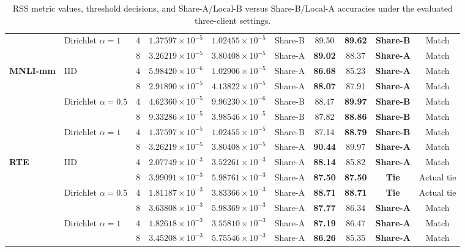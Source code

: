 \documentclass[lettersize,journal]{IEEEtran}
\begin{document}
\begin{table}[!t]
{\begin{tabular}{@{}llcccccccc@{}}
				& \multirow{2}{*}{Dirichlet $\alpha=1$} & 4 & $1.37597\!\times\!10^{-5}$ & $1.02455\!\times\!10^{-5}$ & Share-B & 89.50 & \textbf{89.62} & \textbf{Share-B} & Match \\
				&  & 8 & $3.26219\!\times\!10^{-5}$ & $3.80408\!\times\!10^{-5}$ & Share-A & \textbf{89.02} & 88.37 & \textbf{Share-A} & Match \\
				\midrule
				\multirow{6}{*}{\textbf{MNLI-mm}} & \multirow{2}{*}{IID} & 4 & $5.98420\!\times\!10^{-6}$ & $1.02906\!\times\!10^{-5}$ & Share-A & \textbf{86.68} & 85.23 & \textbf{Share-A} & Match \\
				&  & 8 & $2.91890\!\times\!10^{-5}$ & $4.13822\!\times\!10^{-5}$ & Share-A & \textbf{88.07} & 87.91 & \textbf{Share-A} & Match \\
				& \multirow{2}{*}{Dirichlet $\alpha=0.5$} & 4 & $4.62360\!\times\!10^{-5}$ & $9.96230\!\times\!10^{-6}$ & Share-B & 88.47 & \textbf{89.97} & \textbf{Share-B} & Match \\
				&  & 8 & $9.33286\!\times\!10^{-5}$ & $3.98546\!\times\!10^{-5}$ & Share-B & 87.82 & \textbf{88.86} & \textbf{Share-B} & Match \\
				& \multirow{2}{*}{Dirichlet $\alpha=1$} & 4 & $1.37597\!\times\!10^{-5}$ & $1.02455\!\times\!10^{-5}$ & Share-B & 87.14 & \textbf{88.79} & \textbf{Share-B} & Match \\
				&  & 8 & $3.26219\!\times\!10^{-5}$ & $3.80408\!\times\!10^{-5}$ & Share-A & \textbf{90.44} & 89.97 & \textbf{Share-A} & Match \\
				\midrule
				\multirow{6}{*}{\textbf{RTE}} & \multirow{2}{*}{IID} & 4 & $2.07749\!\times\!10^{-3}$ & $3.52261\!\times\!10^{-3}$ & Share-A & \textbf{88.14} & 85.82 & \textbf{Share-A} & Match \\
				&  & 8 & $3.99091\!\times\!10^{-3}$ & $5.98761\!\times\!10^{-3}$ & Share-A & \textbf{87.50} & \textbf{87.50} & \textbf{Tie} & Actual tie \\
				& \multirow{2}{*}{Dirichlet $\alpha=0.5$} & 4 & $1.81187\!\times\!10^{-3}$ & $3.83366\!\times\!10^{-3}$ & Share-A & \textbf{88.71} & \textbf{88.71} & \textbf{Tie} & Actual tie \\
				&  & 8 & $3.63808\!\times\!10^{-3}$ & $5.98369\!\times\!10^{-3}$ & Share-A & \textbf{87.77} & 86.34 & \textbf{Share-A} & Match \\
				& \multirow{2}{*}{Dirichlet $\alpha=1$} & 4 & $1.82618\!\times\!10^{-3}$ & $3.55810\!\times\!10^{-3}$ & Share-A & \textbf{87.19} & 86.47 & \textbf{Share-A} & Match \\
				&  & 8 & $3.45208\!\times\!10^{-3}$ & $5.75546\!\times\!10^{-3}$ & Share-A & \textbf{86.26} & 85.35 & \textbf{Share-A} & Match \\
				\bottomrule
			\end{tabular}%
		}
		\caption{RSS metric values, threshold decisions, and Share-A/Local-B versus Share-B/Local-A accuracies under the evaluated three-client settings.}
		\label{tab:rss_metric_vs_share_acc_tau_gen}
	\end{table}
	
\end{document}
